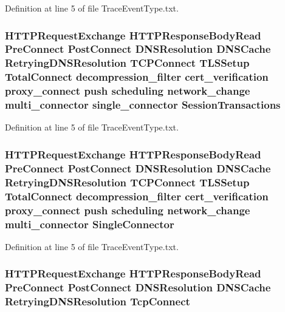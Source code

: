 Definition at line 5 of file Trace\+Event\+Type.\+txt.

\subsubsection[{Session\+Transactions}]{ H\+T\+T\+P\+Request\+Exchange H\+T\+T\+P\+Response\+Body\+Read {\bf Pre\+Connect} {\bf Post\+Connect} D\+N\+S\+Resolution D\+N\+S\+Cache Retrying\+D\+N\+S\+Resolution T\+C\+P\+Connect T\+L\+S\+Setup {\bf Total\+Connect} decompression\+\_\+filter cert\+\_\+verification proxy\+\_\+connect push scheduling network\+\_\+change multi\+\_\+connector single\+\_\+connector Session\+Transactions}\label{TraceEventType_8txt_a00fbb6b53fedd2fd2fc0b04220179c2b}


Definition at line 5 of file Trace\+Event\+Type.\+txt.

\subsubsection[{Single\+Connector}]{ H\+T\+T\+P\+Request\+Exchange H\+T\+T\+P\+Response\+Body\+Read {\bf Pre\+Connect} {\bf Post\+Connect} D\+N\+S\+Resolution D\+N\+S\+Cache Retrying\+D\+N\+S\+Resolution T\+C\+P\+Connect T\+L\+S\+Setup {\bf Total\+Connect} decompression\+\_\+filter cert\+\_\+verification proxy\+\_\+connect push scheduling network\+\_\+change multi\+\_\+connector Single\+Connector}\label{TraceEventType_8txt_a75e2128e80e9942672f66fa30c223f76}


Definition at line 5 of file Trace\+Event\+Type.\+txt.

\subsubsection[{Tcp\+Connect}]{ H\+T\+T\+P\+Request\+Exchange H\+T\+T\+P\+Response\+Body\+Read {\bf Pre\+Connect} {\bf Post\+Connect} D\+N\+S\+Resolution D\+N\+S\+Cache Retrying\+D\+N\+S\+Resolution Tcp\+Connect}\label{TraceEventType_8txt_a202f0c39934c52555429f47a335e78ea}


